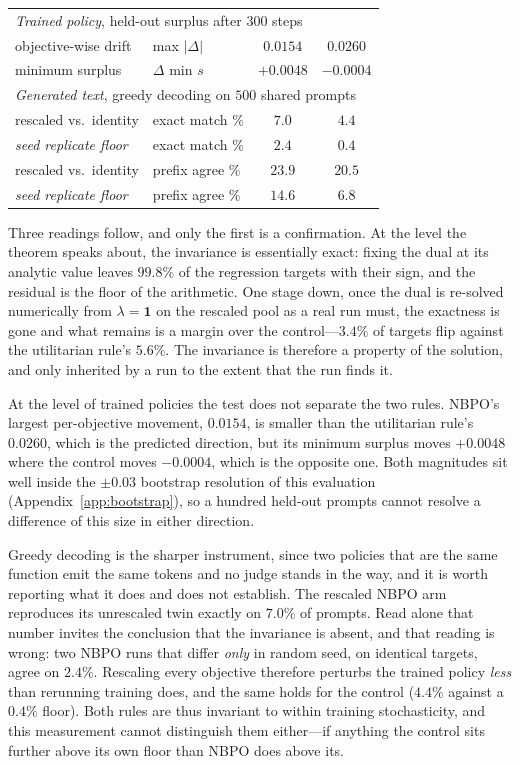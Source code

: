 \documentclass{article}
\theoremstyle{remark}
\theoremstyle{plain}
\newcommand{\NBPO}{\textsc{NBPO}}
\begin{document}
\begin{table}[htbp]
\begin{tabular}{llcc}
\midrule
\multicolumn{4}{l}{\emph{Trained policy}, held-out surplus after $300$ steps}\\
\quad objective-wise drift & max $|\Delta|$ & $\mathbf{0.0154}$ & $0.0260$\\
\quad minimum surplus & $\Delta$ min $s$ & $+0.0048$ & $\mathbf{-0.0004}$\\
\midrule
\multicolumn{4}{l}{\emph{Generated text}, greedy decoding on $500$ shared prompts}\\
\quad rescaled vs.\ identity & exact match \% & $7.0$ & $4.4$\\
\quad \emph{seed replicate floor} & exact match \% & $2.4$ & $0.4$\\
\quad rescaled vs.\ identity & prefix agree \% & $23.9$ & $20.5$\\
\quad \emph{seed replicate floor} & prefix agree \% & $14.6$ & $6.8$\\
\bottomrule
\end{tabular}
\end{table}

Three readings follow, and only the first is a confirmation. At the level the theorem speaks about, the
invariance is essentially exact: fixing the dual at its analytic value leaves $99.8\%$ of the regression
targets with their sign, and the residual is the floor of the arithmetic. One stage down, once the dual is
re-solved numerically from $\lambda=\mathbf 1$ on the rescaled pool as a real run must, the exactness is
gone and what remains is a margin over the control---$3.4\%$ of targets flip against the utilitarian rule's
$5.6\%$. The invariance is therefore a property of the solution, and only inherited by a run to the extent
that the run finds it.

At the level of trained policies the test does not separate the two rules. \NBPO{}'s largest per-objective
movement, $0.0154$, is smaller than the utilitarian rule's $0.0260$, which is the predicted direction, but
its minimum surplus moves $+0.0048$ where the control moves $-0.0004$, which is the opposite one. Both
magnitudes sit well inside the $\pm0.03$ bootstrap resolution of this evaluation
(Appendix~\ref{app:bootstrap}), so a hundred held-out prompts cannot resolve a difference of this size in
either direction.

Greedy decoding is the sharper instrument, since two policies that are the same function emit the same
tokens and no judge stands in the way, and it is worth reporting what it does and does not establish. The
rescaled \NBPO{} arm reproduces its unrescaled twin exactly on $7.0\%$ of prompts. Read alone that number
invites the conclusion that the invariance is absent, and that reading is wrong: two \NBPO{} runs that
differ \emph{only} in random seed, on identical targets, agree on $2.4\%$. Rescaling every objective
therefore perturbs the trained policy \emph{less} than rerunning training does, and the same holds for the
control ($4.4\%$ against a $0.4\%$ floor). Both rules are thus invariant to within training stochasticity,
and this measurement cannot distinguish them either---if anything the control sits further above its own
floor than \NBPO{} does above its.
\end{document}
